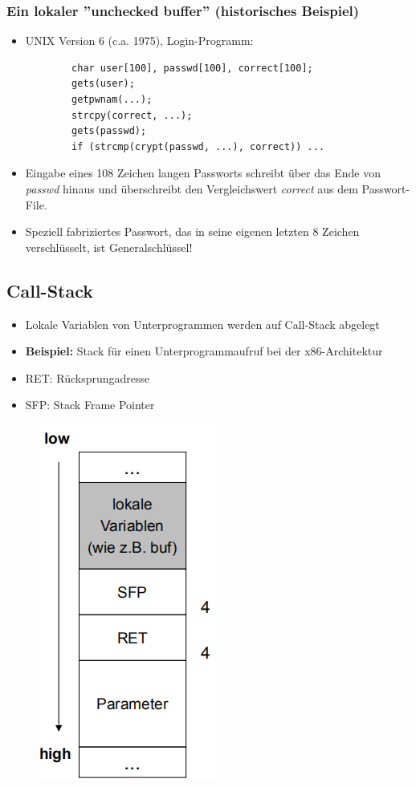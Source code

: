 \documentclass[openany]{book}
\begin{document}
\subsubsection{Ein lokaler ''unchecked buffer'' (historisches Beispiel)}

\begin{itemize}
    \item UNIX Version 6 (c.a. 1975), Login-Programm: 
    \begin{lstlisting}
        char user[100], passwd[100], correct[100];
        gets(user);
        getpwnam(...);
        strcpy(correct, ...);
        gets(passwd);
        if (strcmp(crypt(passwd, ...), correct)) ...
    \end{lstlisting}
    \item Eingabe eines 108 Zeichen langen Passworts schreibt über das Ende von \textit{passwd} hinaus und überschreibt den Vergleichswert \textit{correct} aus dem Passwort-File.
    \item Speziell fabriziertes Passwort, das in seine eigenen letzten 8 Zeichen verschlüsselt, ist Generalschlüssel!
\end{itemize}

\subsection{Call-Stack}

\begin{itemize}
    \item Lokale Variablen von Unterprogrammen werden auf Call-Stack abgelegt
    \item \textbf{Beispiel:} Stack für einen Unterprogrammaufruf bei der x86-Architektur
    \item RET: Rücksprungadresse
    \item SFP: Stack Frame Pointer
\end{itemize}

\newpage

\begin{figure}[h!]
    \centering
    \includegraphics[width=0.35\linewidth]{Pics/BufferOverflow1.PNG}
\end{figure}
\end{document}
